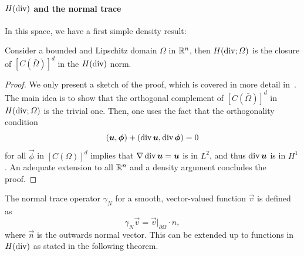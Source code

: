 \paragraph{\texorpdfstring{$H(\operatorname{\text{div}})$ and the normal trace}{H(div) and the normal trace}} In this space, we have a first simple density result: 
\begin{theorem}\label{thm:def-Hdiv-closure}
Consider a bounded and Lipschitz domain $\Omega$ in $\mathbb{R}^n$, then $H(\operatorname{\text{div}};\Omega)$ is the closure of $[C(\bar\Omega)]^d$ in the $H(\operatorname{\text{div}})$ norm.
\begin{proof}
We only present a sketch of the proof, which is covered in more detail in~\cite[Theorem 3.22]{monk2003finite}. The main idea is to show that the orthogonal complement of $[C(\bar\Omega)]^d$ in $H(\operatorname{\text{div}};\Omega)$ is the trivial one. Then, one uses the fact that the orthogonality condition 
\begin{equation*}
    (\vec u, \vec \phi) + (\dive \vec u, \dive \vec \phi) = 0
\end{equation*}
for all $\vec\phi$ in $[C(\Omega)]^d$ implies that $\grad \dive\vec u = \vec u$ is in $L^2$, and thus $\dive \vec u$ is in $H^1$. An adequate extension to all $\mathbb{R}^n$ and a density argument concludes the proof.
\end{proof}
\end{theorem}
\begin{definition}\label{def:normal-trace}
    The normal trace operator $\gamma_N$ for a smooth, vector-valued function $\vec v$ is defined as 
    \begin{equation}\label{eq:def-normal-trace}
        \gamma_N \vec v = \vec v|_{\partial\Omega} \cdot n,
    \end{equation}
    where $\vec n $ is the outwards normal vector. This can be extended up to functions in $H(\operatorname{\text{div}})$ as stated in the following theorem.
\end{definition}
